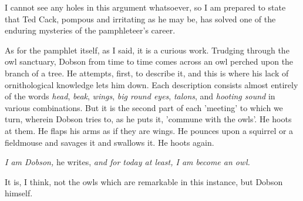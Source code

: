I cannot see any holes in this argument whatsoever, so I am prepared to state that Ted Cack, pompous and irritating as he may be, has solved one of the enduring mysteries of the pamphleteer's career.

As for the pamphlet itself, as I said, it is a curious work. Trudging through the owl sanctuary, Dobson from time to time comes across an owl perched upon the branch of a tree. He attempts, first, to describe it, and this is where his lack of ornithological knowledge lets him down. Each description consists almost entirely of the words \emph{head}, \emph{beak}, \emph{wings}, \emph{big round eyes}, \emph{talons}, and \emph{hooting sound} in various combinations. But it is the second part of each 'meeting' to which we turn, wherein Dobson tries to, as he puts it, 'commune with the owls'. He hoots at them. He flaps his arms as if they are wings. He pounces upon a squirrel or a fieldmouse and savages it and swallows it. He hoots again.

\emph{I am Dobson,} he writes, \emph{and for today at least, I am become an owl.}

It is, I think, not the owls which are remarkable in this instance, but Dobson himself.